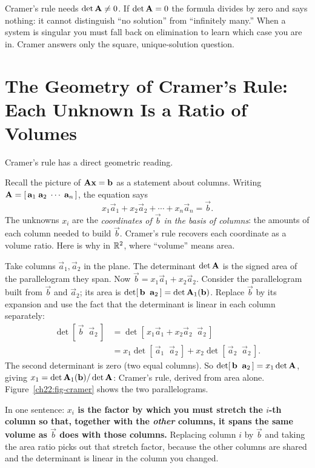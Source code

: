 \begin{trapbox}
Cramer's rule needs $\det\mathbf{A}\neq0$. If $\det\mathbf{A}=0$ the formula divides by zero and says
nothing: it cannot distinguish ``no solution'' from ``infinitely many.'' When a system is singular
you must fall back on elimination to learn which case you are in. Cramer answers only the square,
unique-solution question.
\end{trapbox}

\section{The Geometry of Cramer's Rule: Each Unknown Is a Ratio of Volumes}

Cramer's rule has a direct geometric reading.

Recall the picture of $\mathbf{A}\mathbf{x}=\mathbf{b}$ as a statement about columns. Writing $\mathbf{A}=[\,\mathbf{a}_1\;\mathbf{a}_2\;\cdots\;\mathbf{a}_n\,]$, the equation says
\[
x_1\vec a_1+x_2\vec a_2+\cdots+x_n\vec a_n=\vec b.
\]
The unknowns $x_i$ are the \emph{coordinates of $\vec b$ in the basis of columns}: the amounts of
each column needed to build $\vec b$. Cramer's rule recovers each coordinate as a volume ratio. Here
is why in $\mathbb{R}^2$, where ``volume'' means area.

Take columns $\vec a_1,\vec a_2$ in the plane. The determinant $\det\mathbf{A}$ is the signed area of the
parallelogram they span. Now $\vec b=x_1\vec a_1+x_2\vec a_2$. Consider the parallelogram built from
$\vec b$ and $\vec a_2$; its area is $\det[\,\mathbf{b}\;\;\mathbf{a}_2\,]=\det\mathbf{A}_1(\mathbf{b})$. Replace
$\vec b$ by its expansion and use the fact that the determinant is linear in each column separately:
\[
\begin{aligned}
\det[\,\vec b\;\;\vec a_2\,]&=\det[\,x_1\vec a_1+x_2\vec a_2\;\;\vec a_2\,]\\
&= x_1\det[\,\vec a_1\;\;\vec a_2\,]+x_2\det[\,\vec a_2\;\;\vec a_2\,].
\end{aligned}
\]
The second determinant is zero (two equal columns). So $\det[\,\mathbf{b}\;\;\mathbf{a}_2\,]=x_1\det\mathbf{A}$,
giving $x_1=\det\mathbf{A}_1(\mathbf{b})/\det\mathbf{A}$: Cramer's rule, derived from area alone.
Figure~\ref{ch22:fig-cramer} shows the two parallelograms.

\begin{intuitionbox}
In one sentence: \textbf{$x_i$ is the factor by which you must stretch the $i$-th
column so that, together with the \emph{other} columns, it spans the same volume as $\vec b$ does with
those columns.} Replacing column $i$ by $\vec b$ and taking the area ratio picks out that
stretch factor, because the other columns are shared and the determinant is linear in the column you
changed.
\end{intuitionbox}

